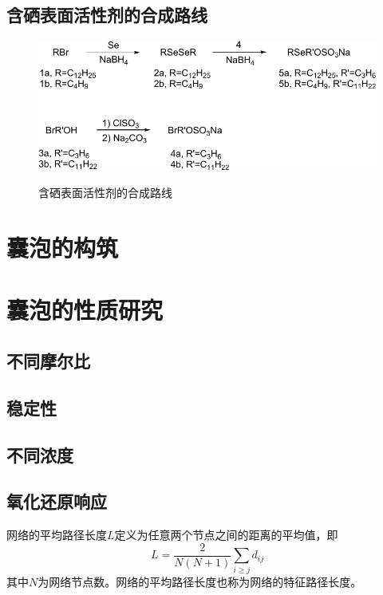 \documentclass[bachelor,fandolfonts,replaceperiod]{jnuthesis} %
\begin{document}
    \subsection{含硒表面活性剂的合成路线}
    \begin{figure}[htbp]
        \centering
        \includegraphics[]{Figure/synthesis.pdf}\\
        \caption{含硒表面活性剂的合成路线}\label{fig:synthesis}
    \end{figure}
    
    \zhlipsum[1]
    
    \section{囊泡的构筑}
    \zhlipsum[1]
    
    \section{囊泡的性质研究}
    \subsection{不同摩尔比}
    
    \subsection{稳定性}
    
    \subsection{不同浓度}
    
    \subsection{氧化还原响应}
    
    \begin{definition}[平均路径长度]
        网络的平均路径长度$L$定义为任意两个节点之间的距离的平均值，即
        \begin{equation}\label{eq:avarage_path_lentgh}
        L = \frac{2}{N(N+1)}\sum_{i\geq j}d_{ij}
        \end{equation}
        其中$N$为网络节点数。网络的平均路径长度也称为网络的特征路径长度。
    \end{definition}
    
\end{document}
